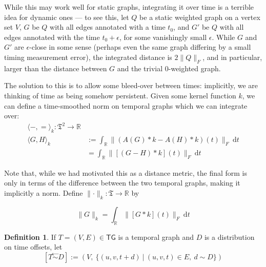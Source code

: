 \documentclass{article}
\theoremstyle{definition}
\newtheorem{defn}{Definition}
\newcommand{\noised}[2]{\left[#1 \stackrel{\gets}{\sim } #2\right]}
\begin{document}
	While this may work well for static graphs, integrating it over time is a terrible idea for dynamic ones --- to see this, let $Q$ be a static weighted graph on a vertex set $V$, $G$ be $Q$ with all edges annotated with a time $t_0$, and $G'$ be $Q$ with all edges annotated with the time $t_0 + \epsilon$, for some vanishingly small $\epsilon$. While $G$ and $G'$ are $\epsilon$-close in some sense (perhaps even the same graph differing by a small timing measurement error), the integrated distance is $2\lVert Q \rVert_F$, and in particular, larger than the distance between $G$ and the trivial 0-weighted graph.
	
	The solution to this is to allow some bleed-over between times: implicitly, we are thinking of time as being somehow persistent. Given some kernel function $k$, we can define a time-smoothed norm on temporal graphs which we can integrate over:	
	\begin{align*}
		\Big\langle -,= \Big\rangle_k: \mathfrak T^2 \to \mathbb R \\
		\Big\langle G, H \Big\rangle_k &:= \int_{\mathbb R}\Big\lVert (A(G) \ast k - A(H) \ast k)(t) \Big\rVert_F~\mathrm d t\\
		&= \int_{\mathbb R} \Big\lVert [(G - H) * k](t) \Big\rVert_F~\mathrm d t 
	\end{align*} 
	
	Note that, while we had motivated this as a distance metric, the final form is only in terms of the difference between the two temporal graphs, making it implicitly a norm. Define $\lVert \cdot \rVert_k : \mathfrak T \to \mathbb R$ by
	
	\begin{equation*}
		\lVert G \rVert_k = \int_{\mathbb R} \Big\lVert [G * k](t) \Big\rVert_F~\mathrm d t 
	\end{equation*}
	\[ \]
	 
	\begin{defn}
		If $T = (V,E) \in \mathsf{TG}$ is a temporal graph and $D$ is a distribution on time offsets, let 
		\[ \noised T D := \left(V,~\Big\{ (u,v,t +d) ~\Big|~ (u,v,t) \in E,~d \sim D \Big\}\right) \]
	\end{defn}
	
\end{document}
